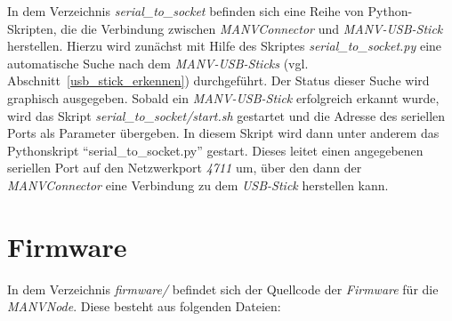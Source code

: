     In dem Verzeichnis \emph{serial\_to\_socket} befinden sich eine Reihe von Python-Skripten, die die
    Verbindung zwischen \emph{MANVConnector} und \emph{MANV-USB-Stick} herstellen. Hierzu 
    wird zunächst mit Hilfe des Skriptes \emph{serial\_to\_socket.py} eine automatische Suche nach dem 
    \emph{MANV-USB-Sticks} (vgl. Abschnitt~\ref{usb_stick_erkennen}) durchgeführt. Der Status
    dieser Suche wird graphisch ausgegeben. Sobald ein \emph{MANV-USB-Stick} erfolgreich
    erkannt wurde, wird das Skript \emph{serial\_to\_socket/start.sh} gestartet und die
    Adresse des seriellen Ports als Parameter übergeben. In diesem Skript wird
    dann unter anderem das Pythonskript "`serial\_to\_socket.py"' gestart. Dieses leitet einen
    angegebenen seriellen Port auf den Netzwerkport \emph{4711} um, über den dann der
    \emph{MANVConnector} eine Verbindung zu dem \emph{USB-Stick} herstellen kann.
    
    \section{Firmware}

    In dem Verzeichnis \emph{firmware/} befindet sich der Quellcode der \emph{Firmware} für die \emph{MANVNode}.
    Diese besteht aus folgenden Dateien:

